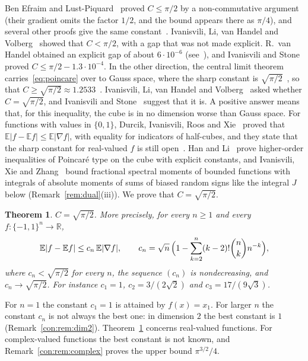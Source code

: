 \documentclass[11pt]{amsart}
\newtheorem{theorem}{Theorem}[section]
\theoremstyle{remark}
\numberwithin{equation}{section}
\newcommand{\R}{\mathbb{R}}
\newcommand{\E}{\mathbb{E}}
\begin{document}
Ben Efraim and Lust-Piquard~\cite{BEL08} proved $C\le\pi/2$ by a non-commutative argument (their gradient omits the factor $1/2$, and the bound appears there as $\pi/4$), and several other proofs give the same constant~\cite{ILvHV}. Ivanisvili, Li, van Handel and Volberg~\cite{ILvHV} showed that $C<\pi/2$, with a gap that was not made explicit. R.~van Handel obtained an explicit gap of about $6\cdot10^{-6}$ (see~\cite[Section~1.3]{IS24}), and Ivanisvili and Stone~\cite[Corollary~3]{IS24} proved $C\le\pi/2-1.3\cdot10^{-4}$. In the other direction, the central limit theorem carries~\eqref{eq:poincare} over to Gauss space, where the sharp constant is $\sqrt{\pi/2}$~\cite{Pis86}, so that $C\ge\sqrt{\pi/2}\approx1.2533$~\cite{ILvHV}. Ivanisvili, Li, van Handel and Volberg~\cite{ILvHV} asked whether $C=\sqrt{\pi/2}$, and Ivanisvili and Stone~\cite[Remark~1.3]{IS24} suggest that it is. A positive answer means that, for this inequality, the cube is in no dimension worse than Gauss space. For functions with values in $\{0,1\}$, Durcik, Ivanisvili, Roos and Xie~\cite[Theorem~1.3]{DIRX26} proved that $\E|f-\E f|\le\E|\nabla f|$, with equality for indicators of half-cubes, and they state that the sharp constant for real-valued $f$ is still open~\cite{DIRX26}. Han and Li~\cite{HL26} prove higher-order inequalities of Poincar\'e type on the cube with explicit constants, and Ivanisvili, Xie and Zhang~\cite[Section~6]{IXZ26} bound fractional spectral moments of bounded functions with integrals of absolute moments of sums of biased random signs like the integral $J$ below (Remark~\ref{rem:dual}(iii)). We prove that $C=\sqrt{\pi/2}$.

\begin{theorem}\label{thm:main}
$C=\sqrt{\pi/2}$. More precisely, for every $n\ge1$ and every $f\colon\{-1,1\}^n\to\R$,
\[
\E|f-\E f|\le c_n\,\E|\nabla f|,\qquad c_n=\sqrt n\,\Bigl(1-\sum_{k=2}^n(k-2)!\binom nk n^{-k}\Bigr),
\]
where $c_n<\sqrt{\pi/2}$ for every $n$, the sequence $(c_n)$ is nondecreasing, and $c_n\to\sqrt{\pi/2}$. For instance $c_1=1$, $c_2=3/(2\sqrt2)$ and $c_3=17/(9\sqrt3)$.
\end{theorem}

For $n=1$ the constant $c_1=1$ is attained by $f(x)=x_1$. For larger $n$ the constant $c_n$ is not always the best one: in dimension $2$ the best constant is $1$ (Remark~\ref{con:rem:dim2}). Theorem~\ref{thm:main} concerns real-valued functions. For complex-valued functions the best constant is not known, and Remark~\ref{con:rem:complex} proves the upper bound $\pi^{3/2}/4$.
\end{document}
